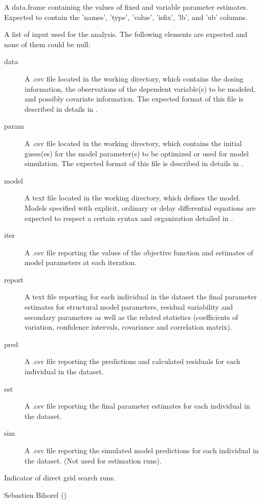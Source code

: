 \begin{Arguments}
\begin{ldescription}
\begin{description}
\end{description}


\item[\code{param}] A data.frame containing the values of fixed and variable 
parameter estimates. Expected to contain the 'names', 'type', 'value',
'isfix', 'lb', and 'ub' columns.
\item[\code{files}] A list of input used for the analysis. The following elements are
expected and none of them could be null: \begin{description}

\item[data] A .csv file located in the working directory, which contains
the dosing information, the observations of the dependent variable(s)
to be modeled, and possibly covariate information. The expected format 
of this file is described in details in .
\item[param] A .csv file located in the working directory, which contains
the initial guess(es) for the model parameter(s) to be optimized or used
for model simulation. The expected format of this file is described in
details in .
\item[model] A text file located in the working directory, which defines 
the model. Models specified with explicit, ordinary or delay 
differential equations are expected to respect a certain syntax and 
organization detailed in .
\item[iter] A .csv file reporting the values of the objective function
and estimates of model parameters at each iteration.
\item[report] A text file reporting for each individual in the dataset the
final parameter estimates for structural model parameters, residual 
variability and secondary parameters as well as the related statistics 
(coefficients of variation, confidence intervals, covariance and 
correlation matrix).
\item[pred] A .csv file reporting the predictions and calculated residuals
for each individual in the dataset.
\item[est] A .csv file reporting the final parameter estimates for each
individual in the dataset.
\item[sim] A .csv file reporting the simulated model predictions for each 
individual in the dataset. (Not used for estimation runs).

\end{description}


\item[\code{isgrid}] Indicator of direct grid search runs.
\end{ldescription}
\end{Arguments}
%
\begin{Author}\relax
Sebastien Bihorel ()
\end{Author}
